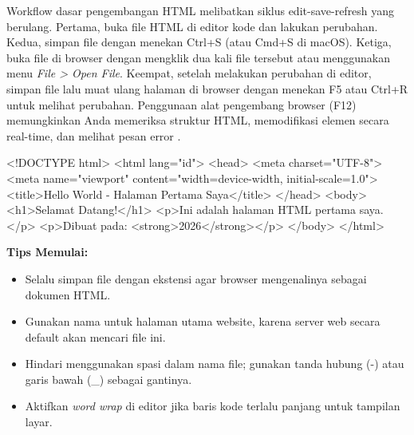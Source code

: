 Workflow dasar pengembangan HTML melibatkan siklus edit-save-refresh yang berulang. Pertama, buka file HTML di editor kode dan lakukan perubahan. Kedua, simpan file dengan menekan Ctrl+S (atau Cmd+S di macOS). Ketiga, buka file di browser dengan mengklik dua kali file tersebut atau menggunakan menu \textit{File > Open File}. Keempat, setelah melakukan perubahan di editor, simpan file lalu muat ulang halaman di browser dengan menekan F5 atau Ctrl+R untuk melihat perubahan. Penggunaan alat pengembang browser (F12) memungkinkan Anda memeriksa struktur HTML, memodifikasi elemen secara real-time, dan melihat pesan error \cite{mdnHtmlIntro}.

\begin{webcode}[language=HTML, caption={File HTML Pertama: hello.html}]
<!DOCTYPE html>
<html lang="id">
<head>
  <meta charset="UTF-8">
  <meta name="viewport" content="width=device-width, initial-scale=1.0">
  <title>Hello World - Halaman Pertama Saya</title>
</head>
<body>
  <h1>Selamat Datang!</h1>
  <p>Ini adalah halaman HTML pertama saya.</p>
  <p>Dibuat pada: <strong>2026</strong></p>
</body>
</html>
\end{webcode}

\begin{catatan}
\textbf{Tips Memulai:}
\begin{itemize}[leftmargin=*]
  \item Selalu simpan file dengan ekstensi  agar browser mengenalinya sebagai dokumen HTML.
  \item Gunakan nama  untuk halaman utama website, karena server web secara default akan mencari file ini.
  \item Hindari menggunakan spasi dalam nama file; gunakan tanda hubung (-) atau garis bawah (\_) sebagai gantinya.
  \item Aktifkan \textit{word wrap} di editor jika baris kode terlalu panjang untuk tampilan layar.
\end{itemize}
\end{catatan}

